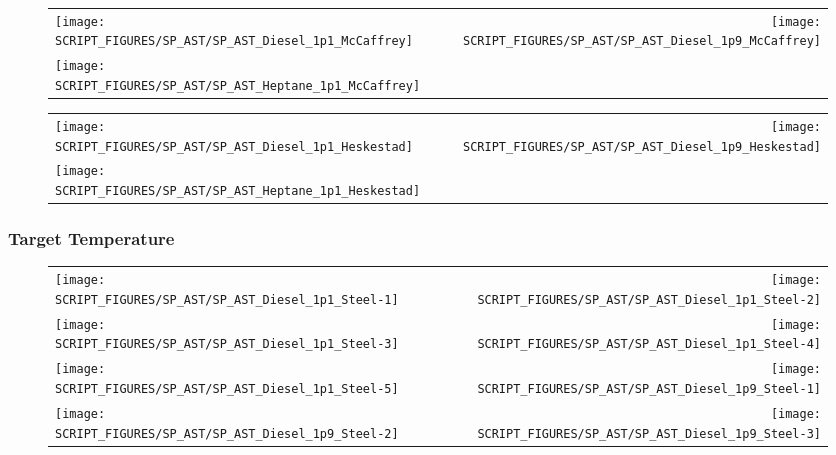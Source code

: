 \begin{figure}[p]
\begin{tabular*}{\textwidth}{l@{\extracolsep{\fill}}r}
\texttt{[image: SCRIPT\_FIGURES/SP\_AST/SP\_AST\_Diesel\_1p1\_McCaffrey]} &
\texttt{[image: SCRIPT\_FIGURES/SP\_AST/SP\_AST\_Diesel\_1p9\_McCaffrey]} \\
\texttt{[image: SCRIPT\_FIGURES/SP\_AST/SP\_AST\_Heptane\_1p1\_McCaffrey]}
\end{tabular*}
\end{figure}

\begin{figure}[p]
\begin{tabular*}{\textwidth}{l@{\extracolsep{\fill}}r}
\texttt{[image: SCRIPT\_FIGURES/SP\_AST/SP\_AST\_Diesel\_1p1\_Heskestad]} &
\texttt{[image: SCRIPT\_FIGURES/SP\_AST/SP\_AST\_Diesel\_1p9\_Heskestad]} \\
\texttt{[image: SCRIPT\_FIGURES/SP\_AST/SP\_AST\_Heptane\_1p1\_Heskestad]}
\end{tabular*}
\end{figure}

\clearpage

\subsubsection{Target Temperature}

\begin{figure}[p]
\begin{tabular*}{\textwidth}{l@{\extracolsep{\fill}}r}
\texttt{[image: SCRIPT\_FIGURES/SP\_AST/SP\_AST\_Diesel\_1p1\_Steel-1]} &
\texttt{[image: SCRIPT\_FIGURES/SP\_AST/SP\_AST\_Diesel\_1p1\_Steel-2]} \\
\texttt{[image: SCRIPT\_FIGURES/SP\_AST/SP\_AST\_Diesel\_1p1\_Steel-3]} &
\texttt{[image: SCRIPT\_FIGURES/SP\_AST/SP\_AST\_Diesel\_1p1\_Steel-4]} \\
\texttt{[image: SCRIPT\_FIGURES/SP\_AST/SP\_AST\_Diesel\_1p1\_Steel-5]} &
\texttt{[image: SCRIPT\_FIGURES/SP\_AST/SP\_AST\_Diesel\_1p9\_Steel-1]} \\
\texttt{[image: SCRIPT\_FIGURES/SP\_AST/SP\_AST\_Diesel\_1p9\_Steel-2]} &
\texttt{[image: SCRIPT\_FIGURES/SP\_AST/SP\_AST\_Diesel\_1p9\_Steel-3]}
\end{tabular*}
\end{figure}

